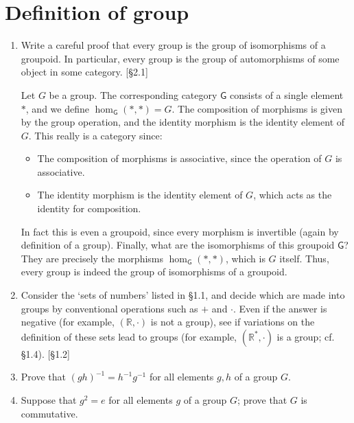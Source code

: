\section{Definition of group}
\begin{enumerate}
    \item Write a careful proof that every group is the group of isomorphisms of a groupoid. In particular, every group is the group of automorphisms of some object in some category. [\S2.1]
    
    \begin{solution}
        Let $G$ be a group. The corresponding category $\mathsf{G}$ consists of a single element $*$, and we define $\hom_\mathsf{G}(*,*) = G$. The composition of morphisms is given by the group operation, and the identity morphism is the identity element of $G$. This really is a category since:
        \begin{itemize}
            \item The composition of morphisms is associative, since the operation of $G$ is associative.
            \item The identity morphism is the identity element of $G$, which acts as the identity for composition.
        \end{itemize}
        In fact this is even a groupoid, since every morphism is invertible (again by definition of a group). Finally, what are the isomorphisms of this groupoid $\mathsf{G}$? They are precisely the morphisms $\hom_\mathsf{G}(*,*)$, which is $G$ itself. Thus, every group is indeed the group of isomorphisms of a groupoid.
    \end{solution}

    \item Consider the `sets of numbers' listed in \S1.1, and decide which are made into groups by conventional operations such as $+$ and $\cdot$. Even if the answer is negative (for example, $(\mathbb{R}, \cdot)$ is not a group), see if variations on the definition of these sets lead to groups (for example, $(\mathbb{R}^*,\cdot)$ is a group; cf. \S1.4). [\S1.2]

    \item Prove that $(gh)^{-1} = h^{-1}g^{-1}$ for all elements $g, h$ of a group $G$.

    \item Suppose that $g^2 = e$ for all elements $g$ of a group $G$; prove that $G$ is commutative.


\end{enumerate}
